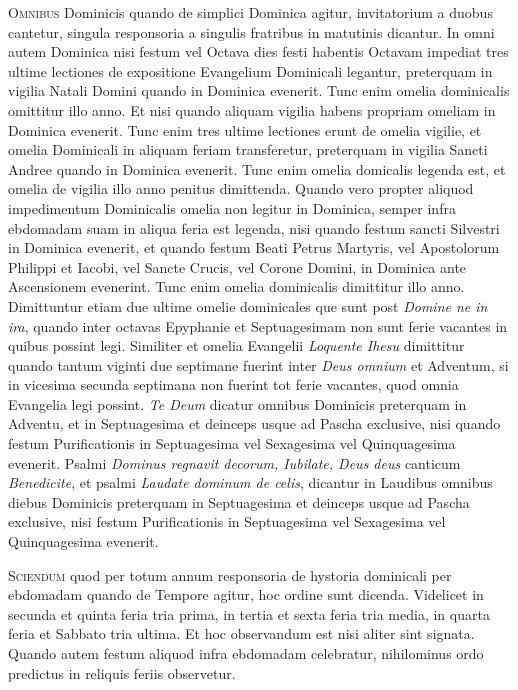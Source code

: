 \begin{multicols*}{2}
{\color{Red} }
\lettrine[lines=2]{\zallmancaps \color{Red} O}{mnibus} Dominicis quando de simplici Dominica agitur, invitatorium a duobus cantetur, singula responsoria a singulis fratribus in matutinis dicantur. In omni autem Dominica nisi festum vel Octava dies festi habentis Octavam impediat tres ultime lectiones de expositione Evangelium Dominicali legantur, preterquam in vigilia Natali Domini quando in Dominica evenerit.
Tunc enim omelia dominicalis omittitur illo anno. Et nisi quando aliquam vigilia habens propriam omeliam in Dominica evenerit. Tunc enim tres ultime lectiones erunt de omelia vigilie, et omelia Dominicali in aliquam feriam transferetur, preterquam in vigilia Sancti Andree quando in Dominica evenerit. Tunc enim omelia domicalis legenda est, et omelia de vigilia illo anno penitus dimittenda.
Quando vero propter aliquod impedimentum Dominicalis omelia non legitur in Dominica, semper infra ebdomadam suam in aliqua feria est legenda, nisi quando festum sancti Silvestri in Dominica evenerit, et quando festum Beati Petrus Martyris, vel Apostolorum Philippi et Iacobi, vel Sancte Crucis, vel Corone Domini, in Dominica ante Ascensionem evenerint. Tunc enim omelia dominicalis dimittitur illo anno. Dimittuntur etiam due ultime omelie dominicales que sunt post \textit{Domine ne in ira}, quando inter octavas Epyphanie et Septuagesimam non sunt ferie vacantes in quibus possint legi. Similiter et omelia Evangelii \textit{Loquente Ihesu} dimittitur quando tantum viginti due septimane fuerint inter \textit{Deus omnium} et Adventum, si in vicesima secunda septimana non fuerint tot ferie vacantes, quod omnia Evangelia legi possint.
\textit{Te Deum} dicatur omnibus Dominicis preterquam in Adventu, et in Septuagesima et deinceps usque ad Pascha exclusive, nisi quando festum Purificationis in Septuagesima vel Sexagesima vel Quinquagesima evenerit.
Psalmi \textit{Dominus regnavit decorum, Iubilate, Deus deus} canticum \textit{Benedicite}, et psalmi \textit{Laudate dominum de celis}, dicantur in Laudibus omnibus diebus Dominicis preterquam in Septuagesima et deinceps usque ad Pascha exclusive, nisi festum Purificationis in Septuagesima vel Sexagesima vel Quinquagesima evenerit.

{\color{Red} }
\lettrine[lines=2]{\zallmancaps \color{Blue} S}{ciendum} quod per totum annum responsoria de hystoria dominicali per ebdomadam quando de Tempore agitur, hoc ordine sunt dicenda. Videlicet in secunda et quinta feria tria prima, in tertia et sexta feria tria media, in quarta feria et Sabbato tria ultima. Et hoc observandum est nisi aliter sint signata. Quando autem festum aliquod infra ebdomadam celebratur, nihilominus ordo predictus in reliquis feriis observetur.


\end{multicols*}
